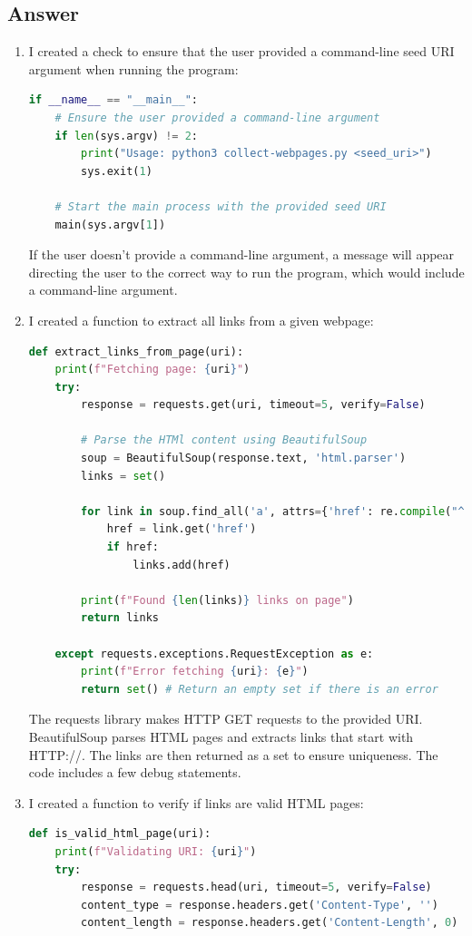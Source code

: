 \documentclass[12pt]{article}
\begin{document}
\subsection*{Answer}
\begin{enumerate}
    \item I created a check to ensure that the user provided a command-line seed URI argument when running the program:
    \begin{lstlisting}[language=Python, label=lst:copy]
    if __name__ == "__main__":
    # Ensure the user provided a command-line argument
    if len(sys.argv) != 2:
        print("Usage: python3 collect-webpages.py <seed_uri>")
        sys.exit(1)

    # Start the main process with the provided seed URI
    main(sys.argv[1])
    \end{lstlisting}
    If the user doesn't provide a command-line argument, a message will appear directing the user to the correct way to run the program, which would include a command-line argument.

    \item I created a function to extract all links from a given webpage:
    \begin{lstlisting}[language=Python, label=1st:copy]
def extract_links_from_page(uri):
    print(f"Fetching page: {uri}")
    try:
        response = requests.get(uri, timeout=5, verify=False)
        
        # Parse the HTMl content using BeautifulSoup
        soup = BeautifulSoup(response.text, 'html.parser')
        links = set()
        
        for link in soup.find_all('a', attrs={'href': re.compile("^https://")}):
            href = link.get('href')
            if href:
                links.add(href)

        print(f"Found {len(links)} links on page")
        return links
    
    except requests.exceptions.RequestException as e:
        print(f"Error fetching {uri}: {e}")
        return set() # Return an empty set if there is an error
    \end{lstlisting}
    The requests library makes HTTP GET requests to the provided URI. BeautifulSoup parses HTML pages and extracts links that start with HTTP://. The links are then returned as a set to ensure uniqueness. The code includes a few debug statements.

    \item I created a function to verify if links are valid HTML pages:
     \begin{lstlisting}[language=Python, label=1st:copy]
def is_valid_html_page(uri):
    print(f"Validating URI: {uri}")
    try:
        response = requests.head(uri, timeout=5, verify=False)
        content_type = response.headers.get('Content-Type', '')
        content_length = response.headers.get('Content-Length', 0)


\end{lstlisting}
\end{enumerate}
\end{document}
